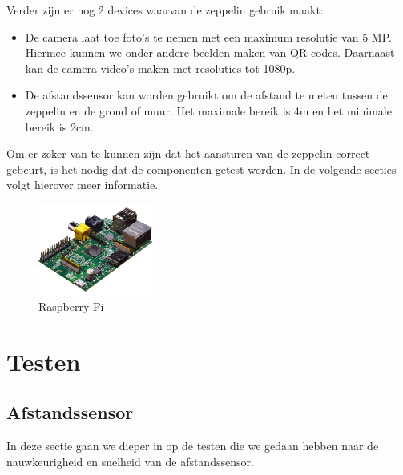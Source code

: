 \documentclass[tt]{penoverslag}
\begin{document}
Verder zijn er nog 2 devices waarvan de zeppelin gebruik maakt:
\begin{itemize}
	\item De camera laat toe foto's te nemen met een maximum resolutie van 5 MP. Hiermee kunnen we onder andere beelden maken van QR-codes. Daarnaast kan de camera video's maken met resoluties tot 1080p. 
	\item De afstandssensor kan worden gebruikt om de afstand te meten tussen de zeppelin en de grond of muur. Het maximale bereik is 4m en het minimale bereik is 2cm.\\
\end{itemize}

Om er zeker van te kunnen zijn dat het aansturen van de zeppelin correct gebeurt, is het nodig dat de componenten getest worden. In de volgende secties volgt hierover meer informatie.\\

\begin{figure}[ht!]
\centering
\includegraphics[height=30mm]{raspb.jpg}
\caption{Raspberry Pi}
\label{Pi}
\end{figure}



\section{Testen}
\subsection{Afstandssensor}

In deze sectie gaan we dieper in op de testen die we gedaan hebben naar de nauwkeurigheid en snelheid van de afstandssensor.
\end{document}
